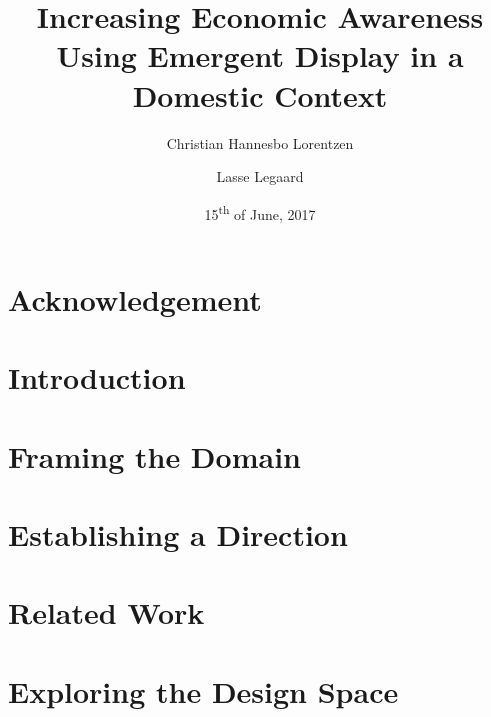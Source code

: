 \documentclass[a4paper, 12pt, twoside]{report}
\title{Increasing Economic Awareness Using Emergent Display in a Domestic Context}
\author{Christian Hannesbo Lorentzen \and Lasse Legaard}
\date{15\textsuperscript{th} of June, 2017}
\begin{document}
\begin{titlepage}
  
\end{titlepage}

\chapter*{Acknowledgement}
\thispagestyle{empty}


\begin{abstract}
  
\end{abstract}

\tableofcontents
\clearpage
\pagestyle{fancy} %


\chapter{Introduction}
\label{ch:introduction}



\chapter{Framing the Domain}
\label{ch:framing-the-domain}



\chapter{Establishing a Direction}
\label{ch:establishing-a-direction}


%
\chapter{Related Work}
\label{ch:related-work}


%
\chapter{Exploring the Design Space}
\label{ch:exploring-the-design-space}

\end{document}
